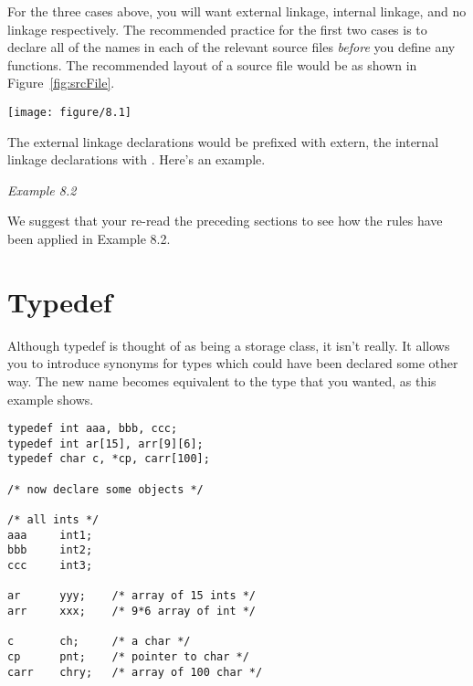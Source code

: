   For the three cases above, you will want external linkage, internal
    linkage, and no linkage respectively. The recommended practice for the
    first two cases is to declare all of the names in each of the relevant
    source files \textit{before} you define any functions. The recommended
    layout of a source file would be as shown in Figure~\ref{fig:srcFile}.


    \begin{figure*}\centering
      \texttt{[image: figure/8.1]}
      \caption*{Diagram showing the typical layout of a C source file, starting            with external linkage declarations, which are followed by internal            linkage declarations, and then functions at the end.}
      \caption{\label{fig:srcFile}Layout of a source file}
    \end{figure*}



   The external linkage declarations would be prefixed with extern, the
    internal linkage declarations with \static. Here's an
    example.


    \begin{center}\textit{Example 8.2}\end{center}


   We suggest that your re-read the preceding sections to see how the
    rules have been applied in Example 8.2.


  

 
        \section{Typedef}
        

  

  Although typedef is thought of as being a storage class, it isn't
   really. It allows you to introduce synonyms for types which could have
   been declared some other way. The new name becomes equivalent to the type
   that you wanted, as this example shows.


\begin{Verbatim}
typedef int aaa, bbb, ccc;
typedef int ar[15], arr[9][6];
typedef char c, *cp, carr[100];

/* now declare some objects */

/* all ints */
aaa     int1;
bbb     int2;
ccc     int3;

ar      yyy;    /* array of 15 ints */
arr     xxx;    /* 9*6 array of int */

c       ch;     /* a char */
cp      pnt;    /* pointer to char */
carr    chry;   /* array of 100 char */
\end{Verbatim}

